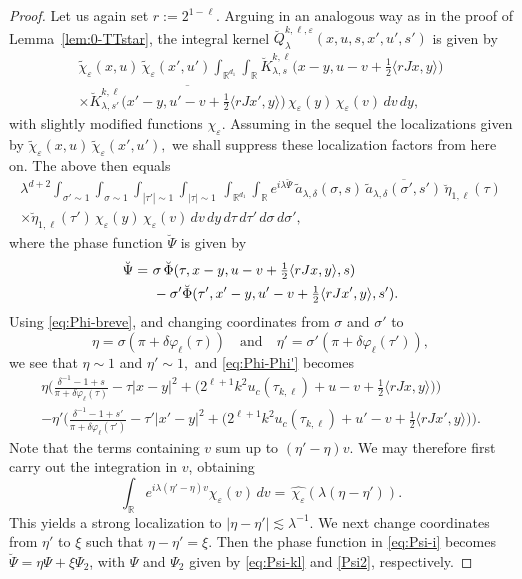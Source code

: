 \documentclass[leqno]{amsart}
\theoremstyle{definition}
\theoremstyle{remark}
\numberwithin{equation}{section}
\newcommand{\R}{\mathbb{R}}
\renewcommand{\hat}{\widehat}
\newcommand\la{{\lambda}}
\newcommand\ve{{\varepsilon}}
\newcommand\de{{\delta}}
\begin{document}
\begin{proof}
Let us again set $r:=2^{1-\ell}$. Arguing in an analogous way as in the proof of Lemma~\ref{lem:0-TTstar}, the integral kernel 
$\breve Q_\lambda^{k,\ell,\varepsilon}(x,u,s,x',u',s')$ is given by
\begin{multline*}
\tilde \chi_\ve(x,u)\, \tilde \chi_\ve(x',u')\int_{\R^{d_1}} \int_{\R} \breve K_{\lambda,s}^{k,\ell}\big(x-y,u-v + \tfrac 1 2 \langle rJx,y\rangle\big) \\
\times \overline{ \breve K_{\lambda,s'}^{k,\ell}\big(x'-y,u'-v + \tfrac 1 2 \langle rJx',y\rangle\big)} \, \chi_\varepsilon(y) \, \chi_\varepsilon(v) \, dv \, dy,
\end{multline*}
with slightly modified functions $\chi_\ve.$ Assuming in the sequel the localizations given by $\tilde \chi_\ve(x,u)\, \tilde \chi_\ve(x',u'),$ we shall suppress these localization factors from here on. The above then equals
\begin{multline*}
\lambda^{d+2} \int_{\sigma'\sim1} \int_{\sigma\sim1}  \int_{|\tau'|\sim1} \int_{|\tau|\sim1} \, \int_{\R^{d_1}} \int_{\R} e^{i\lambda \breve \Psi} \, \tilde a_{\la,\de}(\sigma,s)\, \overline{\tilde a_{\la,\de}(\sigma',s')} \, \breve\eta_{1,\ell}(\tau) \\
\times \breve\eta_{1,\ell}(\tau')\, \chi_\varepsilon(y) \, \chi_\varepsilon(v) \, dv \, dy \, d\tau \, d\tau' \, d\sigma \, d\sigma',
\end{multline*}
where  the phase function $\breve\Psi$ is given by
\begin{align}
\breve\Psi = \ & \sigma \,\breve\Phi(\tau,x-y,u-v + \tfrac 1 2 \langle rJx,y\rangle,s) \label{eq:Phi-Phi'}\\
& - \sigma' \breve\Phi(\tau',x'-y, u'-v + \tfrac 1 2 \langle rJx',y\rangle,s').  \notag
\end{align}
Using \eqref{eq:Phi-breve}, and changing coordinates from $\sigma$ and $\sigma'$ to
\[
\eta = \sigma (\pi + \delta \varphi_\ell(\tau) ) \quad\text{and}\quad \eta' = \sigma' (\pi + \delta\varphi_\ell(\tau') ),
\]
we see that $\eta\sim 1$ and $\eta'\sim 1,$ and \eqref{eq:Phi-Phi'} becomes
\begin{multline}
 \eta \Big( \frac{\delta^{-1}-1 + s}{\pi + \delta \varphi_\ell(\tau)} - \tau| x-y|^2  +  \big( 2^{\ell+1} k^2 u_c(\tau_{k,\ell}) + u-v + \tfrac 1 2 \langle rJx,y\rangle\big)\Big) \label{eq:Psi-i}\\
 - \eta' \Big( \frac{\delta^{-1}-1 + s'}{\pi + \delta \varphi_\ell(\tau')} - \tau'\left|x'-y\right|^2  + \big(2^{\ell+1} k^2 u_c(\tau_{k,\ell}) + u'-v + \tfrac 1 2 \langle rJx',y\rangle\big)\Big).
\end{multline}
Note that the terms containing $v$ sum up to $(\eta'-\eta)v$. We may therefore first carry out the integration in $v$, obtaining
\[
\int_{\R} e^{i\lambda (\eta' -\eta) v} \chi_\varepsilon(v) \, dv = \, \hat{ \chi_\ve} \left( \la(\eta-\eta') \right).
\]
This yields a strong localization to $|\eta-\eta'|\lesssim\lambda^{-1}$. We next change coordinates from $\eta'$ to $\xi$ such that $\eta -\eta'= \xi$. Then the phase function in \eqref{eq:Psi-i} becomes $\breve\Psi=\eta \Psi+ \xi \Psi_2$, with $\Psi$ and $\Psi_2$ given by \eqref{eq:Psi-kl} and \eqref{Psi2}, respectively.


\end{proof}
\end{document}
